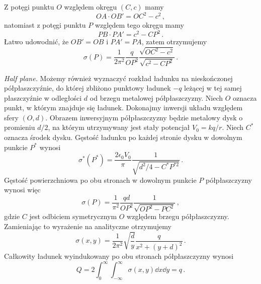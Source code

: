 \documentclass[../main.tex]{subfiles}
\begin{document}
\begin{enumerate}
    Z potęgi punktu \(O\) względem okręgu \((C,c)\) mamy
    \begin{equation*}
        OA\cdot OB'=OC^2-c^2\,,
    \end{equation*}
    natomiast z potęgi punktu \(P\) względem tego okręgu mamy
    \begin{equation*}
        PB\cdot PA'=c^2-CP^2\,.
    \end{equation*}
    Łatwo udowodnić, że \(OB'=OB\) i \(PA'=PA\), zatem otrzymujemy
    \begin{equation*}
        \sigma(P)=\frac{1}{2\pi^2}\frac{q}{OP^2}\frac{\sqrt{OC^2-c^2}}{\sqrt{c^2-CP^2}}\,.
    \end{equation*}
   
   \textit{Half plane.} Możemy również wyznaczyć rozkład ładunku na nieskończonej półpłaszczyźnie,
   do której zbliżono punktowy ładunek \(-q\) leżącej w tej samej płaszczyźnie w odległości \(d\) od
   brzegu metalowej półpłaszczyzny. Niech \(O\) oznacza punkt, w którym znajduje się ładunek.
   Dokonajmy inwersji układu względem sfery \((O,d)\). Obrazem inwersyjnym półpłaszczyzny będzie
   metalowy dysk o promieniu \(d/2\), na którym utrzymywany jest stały potencjał \(V_0=kq/r\). Niech
   \(C^*\) oznacza środek dysku. Gęstość ładunku po każdej stronie dysku w dowolnym punkcie \(P^*\)
   wynosi
    \begin{equation*}
        \sigma^*(P^*)=\frac{2\epsilon_0V_0}{\pi}\frac{1}{\sqrt{d^2/4-C^*P^{*2}}}\,.
    \end{equation*}
    Gęstość powierzchniowa po obu stronach w dowolnym punkcie \(P\) półpłaszczyzny wynosi więc
    \begin{equation*}
        \sigma(P)=\frac{1}{\pi^2}\frac{qd}{OP^2}\frac{1}{\sqrt{OP^2-PC^2}}\,,
    \end{equation*}
    gdzie \(C\) jest odbiciem symetrycznym \(O\) względem brzegu półpłaszczyzny. Zamieniając to
    wyrażenie na analityczne otrzymujemy
    \begin{equation*}
        \sigma(x,y)=\frac{1}{2\pi^2}\sqrt{\frac{d}{y}}\frac{q}{x^2+(y+d)^2}\,.
    \end{equation*}
    Całkowity ładunek wyindukowany po obu stronach półpłaszczyzny wynosi
    \begin{equation*}
        Q=2\int_0^\infty\int_{-\infty}^\infty\sigma(x,y)\dd{x}\dd{y}=q\,.
    \end{equation*}
    \begin{figure}[ht]
        \centering
        \begin{tikzpicture}[line cap=round,line join=round,>=triangle 45,x=1cm,y=1cm,scale=0.2]

\end{tikzpicture}
\end{figure}
\end{enumerate}
\end{document}
